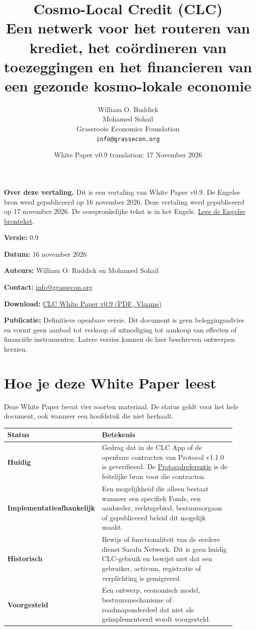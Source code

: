 \documentclass[11pt]{article}
\title{Cosmo-Local Credit (CLC)\\Een netwerk voor het routeren van krediet, het coördineren van toezeggingen en het financieren van een gezonde kosmo-lokale economie}
\author{William O. Ruddick \\ Mohamed Sohail \\ Grassroots Economics Foundation \\ \texttt{info@grassecon.org}}
\date{White Paper v0.9 translation: 17 November 2026}
\begin{document}
\maketitle
\tableofcontents
\newpage
\sloppy
\RaggedRight

\textbf{Over deze vertaling.} Dit is een vertaling van White Paper v0.9. De Engelse bron werd gepubliceerd op 16 november 2026. Deze vertaling werd gepubliceerd op 17 november 2026. De oorspronkelijke tekst is in het Engels. \href{https://docs.cosmolocal.credit/white-paper}{Lees de Engelse brontekst}.

\textbf{Versie:} 0.9

\textbf{Datum:} 16 november 2026

\textbf{Auteurs:} William O. Ruddick en Mohamed Sohail

\textbf{Contact:} \href{mailto:info@grassecon.org}{info@grassecon.org}

\textbf{Download:} \href{https://docs.cosmolocal.credit/white-paper/Cosmo-Local-Credit-CLC-White-Paper-v9-nl-BE.pdf}{CLC White Paper v0.9 (PDF, Vlaams)}

\textbf{Publicatie:} Definitieve openbare versie. Dit document is geen beleggingsadvies en vormt geen aanbod tot verkoop of uitnodiging tot aankoop van effecten of financiële instrumenten. Latere versies kunnen de hier beschreven ontwerpen herzien.

\section*{Hoe je deze White Paper leest}

Deze White Paper bevat vier soorten materiaal. De status geldt voor het hele document, ook wanneer een hoofdstuk die niet herhaalt.

\begin{longtable}{P{0.30\linewidth} P{0.62\linewidth}}
\toprule
Status & Betekenis \\
\midrule
\endhead
\textbf{Huidig} & Gedrag dat in de CLC App of de openbare contracten van Protocol v1.1.0 is geverifieerd. De \href{https://docs.cosmolocal.credit/nl-BE/protocol/overview}{Protocolreferentie} is de feitelijke bron voor die contracten. \\
\textbf{Implementatieafhankelijk} & Een mogelijkheid die alleen bestaat wanneer een specifiek Fonds, een aanbieder, rechtsgebied, bestuursorgaan of gepubliceerd beleid dit mogelijk maakt. \\
\textbf{Historisch} & Bewijs of functionaliteit van de eerdere dienst Sarafu Network. Dit is geen huidig CLC-gebruik en bewijst niet dat een gebruiker, activum, registratie of verplichting is gemigreerd. \\
\textbf{Voorgesteld} & Een ontwerp, economisch model, bestuursmechanisme of roadmaponderdeel dat niet als geïmplementeerd wordt voorgesteld. \\
\bottomrule
\end{longtable}
\end{document}
